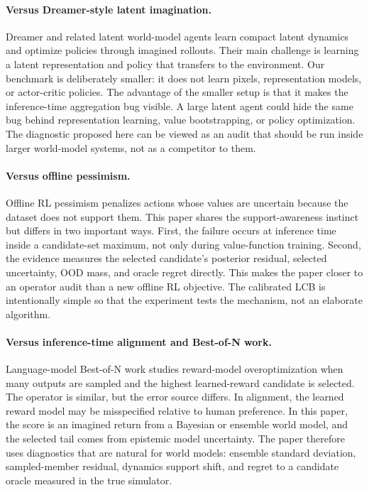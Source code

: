 \documentclass{article}
\begin{document}
\paragraph{Versus Dreamer-style latent imagination.}
Dreamer and related latent world-model agents learn compact latent dynamics and
optimize policies through imagined rollouts. Their main challenge is learning a
latent representation and policy that transfers to the environment. Our
benchmark is deliberately smaller: it does not learn pixels, representation
models, or actor-critic policies. The advantage of the smaller setup is that it
makes the inference-time aggregation bug visible. A large latent agent could
hide the same bug behind representation learning, value bootstrapping, or
policy optimization. The diagnostic proposed here can be viewed as an audit
that should be run inside larger world-model systems, not as a competitor to
them.

\paragraph{Versus offline pessimism.}
Offline RL pessimism penalizes actions whose values are uncertain because the
dataset does not support them. This paper shares the support-awareness instinct
but differs in two important ways. First, the failure occurs at inference time
inside a candidate-set maximum, not only during value-function training.
Second, the evidence measures the selected candidate's posterior residual,
selected uncertainty, OOD mass, and oracle regret directly. This makes the
paper closer to an operator audit than a new offline RL objective. The
calibrated LCB is intentionally simple so that the experiment tests the
mechanism, not an elaborate algorithm.

\paragraph{Versus inference-time alignment and Best-of-N work.}
Language-model Best-of-N work studies reward-model overoptimization when many
outputs are sampled and the highest learned-reward candidate is selected. The
operator is similar, but the error source differs. In alignment, the learned
reward model may be misspecified relative to human preference. In this paper,
the score is an imagined return from a Bayesian or ensemble world model, and
the selected tail comes from epistemic model uncertainty. The paper therefore
uses diagnostics that are natural for world models: ensemble standard
deviation, sampled-member residual, dynamics support shift, and regret to a
candidate oracle measured in the true simulator.
\end{document}
